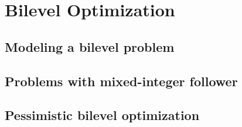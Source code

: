 \part{Bilevel Optimization}

\chapter{Modeling a bilevel problem}


\chapter{Problems with mixed-integer follower}
\label{chapter:bilevel:continuous}

\chapter{Pessimistic bilevel optimization}